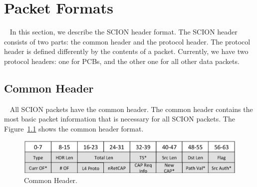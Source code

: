 \chapter{Packet Formats}~\label{sec:packet-format}
In this section, we describe the SCION header format. The SCION header consists of two parts: the common header and the protocol header. 
The protocol header is defined differently by the contents of a packet. Currently, we have two protocol headers: one for PCBs, and the other one for all other data packets.


\section{Common Header}~\label{subsec:common-header}
All SCION packets have the common header. The common header contains the most basic packet information that is necessary for all SCION packets. The Figure~\ref{fig:hdr-common} shows the common header format.

\begin{figure}[ht]
\centering
\includegraphics[width=.9\columnwidth]{./fig/nhdr_common.eps}
\caption{Common Header.}\label{fig:hdr-common}
\end{figure}

